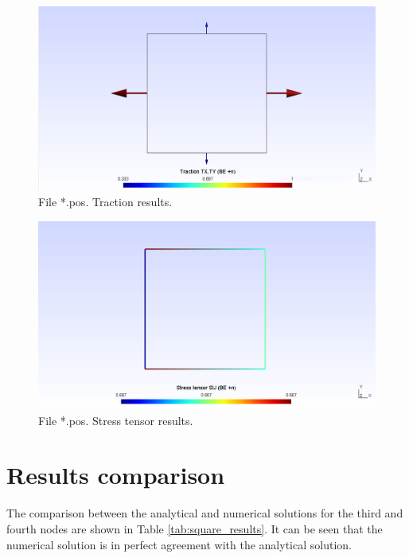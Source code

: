 \documentclass[A4]{article}
\begin{document}
\begin{figure}
	\centering
	\includegraphics[scale = 0.5]{traction.png}
	\caption{File *.pos. Traction results.}
	\label{fig:traction}
\end{figure}

\begin{figure}
	\centering
	\includegraphics[scale = 0.5]{stress.png}
	\caption{File *.pos. Stress tensor results.}
	\label{fig:stress}
\end{figure}

\section{Results comparison}

The comparison between the analytical and numerical solutions for the third and fourth nodes are shown in Table \ref{tab:square_results}. It can be seen that the numerical solution is in perfect agreement with the analytical solution.
\end{document}
